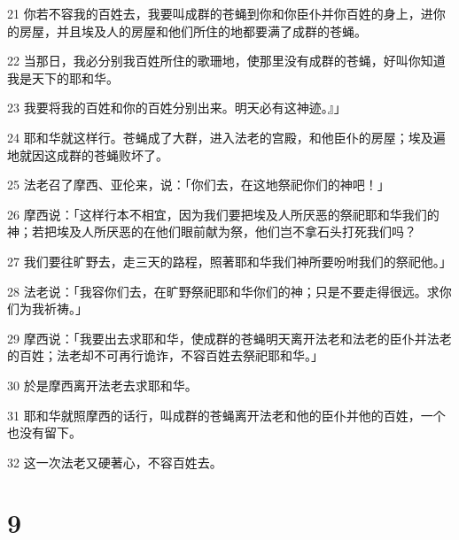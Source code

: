 \par 21 你若不容我的百姓去，我要叫成群的苍蝇到你和你臣仆并你百姓的身上，进你的房屋，并且埃及人的房屋和他们所住的地都要满了成群的苍蝇。
\par 22 当那日，我必分别我百姓所住的歌珊地，使那里没有成群的苍蝇，好叫你知道我是天下的耶和华。
\par 23 我要将我的百姓和你的百姓分别出来。明天必有这神迹。』」
\par 24 耶和华就这样行。苍蝇成了大群，进入法老的宫殿，和他臣仆的房屋；埃及遍地就因这成群的苍蝇败坏了。
\par 25 法老召了摩西、亚伦来，说：「你们去，在这地祭祀你们的神吧！」
\par 26 摩西说：「这样行本不相宜，因为我们要把埃及人所厌恶的祭祀耶和华我们的神；若把埃及人所厌恶的在他们眼前献为祭，他们岂不拿石头打死我们吗？
\par 27 我们要往旷野去，走三天的路程，照著耶和华我们神所要吩咐我们的祭祀他。」
\par 28 法老说：「我容你们去，在旷野祭祀耶和华你们的神；只是不要走得很远。求你们为我祈祷。」
\par 29 摩西说：「我要出去求耶和华，使成群的苍蝇明天离开法老和法老的臣仆并法老的百姓；法老却不可再行诡诈，不容百姓去祭祀耶和华。」
\par 30 於是摩西离开法老去求耶和华。
\par 31 耶和华就照摩西的话行，叫成群的苍蝇离开法老和他的臣仆并他的百姓，一个也没有留下。
\par 32 这一次法老又硬著心，不容百姓去。

\chapter{9}

